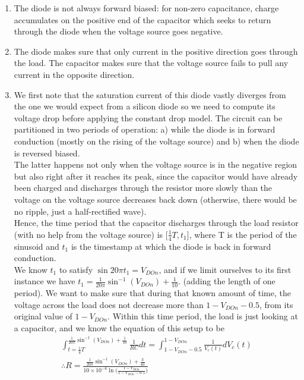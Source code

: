 \documentclass{article}
\begin{document}
\begin{prob}
	\begin{enumerate}
		\item The diode is not always forward biased: for non-zero capacitance, charge accumulates on the positive end of the capacitor which seeks to return through the diode when the voltage source goes negative.
		\item The diode makes sure that only current in the positive direction goes through the load.
			The capacitor makes sure that the voltage source fails to pull any current in the opposite direction.

	\item We first note that the saturation current of this diode vastly diverges from the one we would expect from a silicon diode so we need to compute its voltage drop before applying the constant drop model.
		The circuit can be partitioned in two periods of operation: a) while the diode is in forward conduction (mostly on the rising of the voltage source) and b) when the diode is reversed biased. \\
		The latter happens not only when the voltage source is in the negative region but also right after it reaches its peak, since the capacitor would have already been charged and discharges through the resistor more slowly than the voltage on the voltage source decreases back down (otherwise, there would be no ripple, just a half-rectified wave). \\
		Hence, the time period that the capacitor discharges through the load resistor (with no help from the voltage source) is [$\frac{1}{4}T, t_1]$, where T is the period of the sinusoid and $t_1$ is the timestamp at which the diode is back in forward conduction. \\
		We know $t_1$ to satisfy  $\sin{20\pi t_1}=V_{DOn}$, and if we limit ourselves to its  first instance we have  $t_1=\frac{1}{20\pi}\sin ^{-1}(V_{DOn})+\frac{1}{10}$. (adding the length of one period).
		We want to make sure that during that known amount of time, the voltage across the load does not decrease more than $1-V_{DOn}-0.5$, from its original value of $1-V_{DOn}$.
		Within this time period, the load is just looking at a capacitor, and we know the equation of this setup to be
		\begin{align*}
			\int _{t=\frac{1}{4}T}^{\frac{1}{20\pi}\sin ^{-1}(V_{DOn})+\frac{1}{10}}\frac{1}{RC}dt = \int _{1-V_{DOn}-0.5}^{1-V_{DOn}}\frac{1}{V_c(t)}dV_c(t) \\
			\therefore R= \frac{\frac{1}{20\pi}\sin ^{-1}(V_{DOn})+ \frac{3}{40}}{10\times10^{-6}\ln \big(\frac{1-V_{DOn}}{1-V_{DOn}-0.5}\big)}

\end{align*}
\end{enumerate}
\end{prob}
\end{document}
